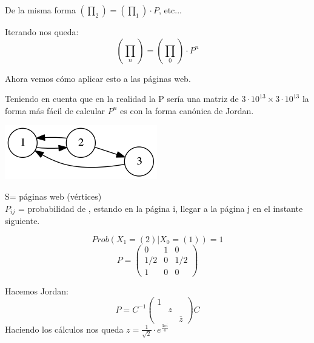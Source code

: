 De la misma forma $(\prod_2) = (\prod_1) \cdot P$, etc...

Iterando nos queda:
$$(\prod_n) = (\prod_0) \cdot P^n$$

Ahora vemos cómo aplicar esto a las páginas web.


Teniendo en cuenta que en la realidad la P sería una matriz de $3\cdot 10^{13} \times 3\cdot 10^{13}$ la forma más fácil de calcular $P^n$ es con la forma canónica de Jordan.
\begin{example}[1]{}



	\begin{center}
		\includegraphics{tex/grafo3nodos.png}
	\end{center}
	
	S= páginas web (vértices)\\
	$P_{ij}$ = probabilidad de , estando en la página i, llegar a la página j en el instante siguiente.

	$$Prob(X_1 = (2)| X_0 = (1)) = 1$$
	$$P =\left(\begin{matrix}
	0 & 1 & 0\\
	1/2 & 0 & 1/2\\
	1 & 0 & 0
	\end{matrix}\right)$$
	
	Hacemos Jordan:
	$$P = C^{-1} \left(\begin{matrix}
	1&&\\
	&z&\\
	&&\overline{z}
	\end{matrix}\right) C$$
	Haciendo los cálculos nos queda $z = \frac{1}{\sqrt{2}}\cdot e^{\frac{3\pi i}{4}}$
	

\end{example}
